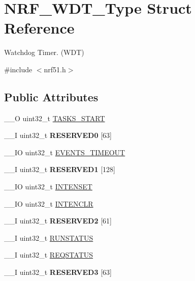\hypertarget{struct_n_r_f___w_d_t___type}{}\section{N\+R\+F\+\_\+\+W\+D\+T\+\_\+\+Type Struct Reference}
\label{struct_n_r_f___w_d_t___type}


Watchdog Timer. (W\+D\+T)  




{\ttfamily \#include $<$nrf51.\+h$>$}

\subsection*{Public Attributes}
\begin{DoxyCompactItemize}
\item 
\+\_\+\+\_\+\+O uint32\+\_\+t \hyperlink{struct_n_r_f___w_d_t___type_a0eaed603e78d2e13b969b90cec26459c}{T\+A\+S\+K\+S\+\_\+\+S\+T\+A\+R\+T}
\item 
\hypertarget{struct_n_r_f___w_d_t___type_aa9eda7d2ab9816509ef254ef16e5e191}{}\+\_\+\+\_\+\+I uint32\+\_\+t {\bfseries R\+E\+S\+E\+R\+V\+E\+D0} \mbox{[}63\mbox{]}\label{struct_n_r_f___w_d_t___type_aa9eda7d2ab9816509ef254ef16e5e191}

\item 
\+\_\+\+\_\+\+I\+O uint32\+\_\+t \hyperlink{struct_n_r_f___w_d_t___type_a11b2abf3299b38692c9561ff66aef941}{E\+V\+E\+N\+T\+S\+\_\+\+T\+I\+M\+E\+O\+U\+T}
\item 
\hypertarget{struct_n_r_f___w_d_t___type_a5aee435635381b02ed6fae3b85ccbe80}{}\+\_\+\+\_\+\+I uint32\+\_\+t {\bfseries R\+E\+S\+E\+R\+V\+E\+D1} \mbox{[}128\mbox{]}\label{struct_n_r_f___w_d_t___type_a5aee435635381b02ed6fae3b85ccbe80}

\item 
\+\_\+\+\_\+\+I\+O uint32\+\_\+t \hyperlink{struct_n_r_f___w_d_t___type_a8c6d29b2a4a37dda33dc5fac9b86059b}{I\+N\+T\+E\+N\+S\+E\+T}
\item 
\+\_\+\+\_\+\+I\+O uint32\+\_\+t \hyperlink{struct_n_r_f___w_d_t___type_a6b21b43f75dc96136792240de4e0eb43}{I\+N\+T\+E\+N\+C\+L\+R}
\item 
\hypertarget{struct_n_r_f___w_d_t___type_a64d3044fd6a70d0aa4b306c61f7a3322}{}\+\_\+\+\_\+\+I uint32\+\_\+t {\bfseries R\+E\+S\+E\+R\+V\+E\+D2} \mbox{[}61\mbox{]}\label{struct_n_r_f___w_d_t___type_a64d3044fd6a70d0aa4b306c61f7a3322}

\item 
\+\_\+\+\_\+\+I uint32\+\_\+t \hyperlink{struct_n_r_f___w_d_t___type_a2a8c0b6c975fb19e151bc285e770a310}{R\+U\+N\+S\+T\+A\+T\+U\+S}
\item 
\+\_\+\+\_\+\+I uint32\+\_\+t \hyperlink{struct_n_r_f___w_d_t___type_ae59d8df18f971c32c98930a75793d7a1}{R\+E\+Q\+S\+T\+A\+T\+U\+S}
\item 
\hypertarget{struct_n_r_f___w_d_t___type_af73f352ad4448e90c402ea6fecad7ef1}{}\+\_\+\+\_\+\+I uint32\+\_\+t {\bfseries R\+E\+S\+E\+R\+V\+E\+D3} \mbox{[}63\mbox{]}\label{struct_n_r_f___w_d_t___type_af73f352ad4448e90c402ea6fecad7ef1}


\end{DoxyCompactItemize}
